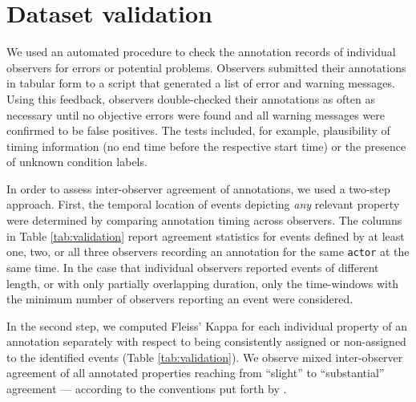 \documentclass[10pt,a4paper]{article}
\begin{document}
\section*{Dataset validation}


We used an automated procedure to check the annotation records of individual
observers for errors or potential problems. Observers submitted their
annotations in tabular form to a script that generated a list of error and
warning messages. Using this feedback, observers double-checked their
annotations as often as necessary until no objective errors were found and all
warning messages were confirmed to be false positives. The tests included, for
example, plausibility of timing information (no end time before the respective
start time) or the presence of unknown condition labels.

In order to assess inter-observer agreement of annotations, we used a two-step
approach. First, the temporal location of events depicting \textit{any}
relevant property were determined by comparing annotation timing across
observers. The columns in Table \ref{tab:validation} report agreement
statistics for events defined by at least one, two, or all three observers
recording an annotation for the same \texttt{actor} at the same time. In the
case that individual observers reported events of different length, or with
only partially overlapping duration, only the time-windows with the minimum
number of observers reporting an event were considered.

In the second step, we computed Fleiss' Kappa \cite{Fle71} for each individual
property of an annotation separately with respect to being consistently
assigned or non-assigned to the identified events (Table \ref{tab:validation}).
We observe mixed inter-observer agreement of all annotated properties reaching from ``slight'' to
``substantial'' agreement — according to the conventions put forth by
\cite{LK77}.






\end{document}
